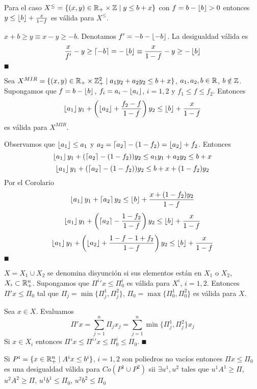 \documentclass[MIOP.tex]{subfiles}
\begin{document}
\begin{coro}
Para el caso $X^\leq =\{(x,y)\in\mathbb{R}_+\times \mathbb{Z} \mid y\leq b+x\}$ con $f=b-\left\lfloor{b}\right\rfloor>0$ entonces $y\leq \left\lfloor{b}\right\rfloor+\frac{x}{1-f}$ es válida para $X^\leq$.
\end{coro}
\begin{dem}
$x+b\geq y \equiv x-y\geq -b$. Denotamos $f'=-b-\left\lfloor{-b}\right\rfloor$. La desigualdad válida es 
$$
\frac{x}{f'}-y\geq \left\lceil{-b}\right\rceil=-\left\lfloor{b}\right\rfloor \equiv \frac{x}{1-f}-y \geq -\left\lfloor{b}\right\rfloor
$$
$\QED$
\end{dem}
\begin{propi}
Sea $X^{MIR}=\{(x,y)\in\mathbb{R}_+\times \mathbb{Z}_+^2 \mid a_1y_2+a_2y_2\leq b+x\}$, $a_1,a_2,b\in\mathbb{R}$, $b\notin \mathbb{Z}$. Supongamos que $f=b-\left\lfloor{b}\right\rfloor$, $f_i = a_i -\left\lfloor{a_i}\right\rfloor$, $i=1,2$ y $f_1\leq f\leq f_2$. Entonces 
$$
\left\lfloor{a_1}\right\rfloor y_1+\left(\left\lfloor{a_2}\right\rfloor+\frac{f_2-f}{1-f}\right)y_2\leq \left\lfloor{b}\right\rfloor+\frac{x}{1-f}$$
es válida para $X^{MIR}$.
\end{propi}
\begin{dem}
Observamos que $\left\lfloor{a_1}\right\rfloor\leq a_1$ y $a_2=\left\lceil{a_2}\right\rceil-(1-f_2)=\left\lfloor{a_2}\right\rfloor+f_2$. Entonces
$$
\left\lfloor{a_1}\right\rfloor y_1+(\left\lceil{a_2}\right\rceil-(1-f_2))y_2 \leq a_1y_1 + a_2y_2\leq b+x
$$
$$\left\lfloor{a_1}\right\rfloor y_1+(\left\lceil{a_2}\right\rceil-(1-f_2))y_2 \leq b+x+(1-f_2)y_2$$
Por el Corolario
$$
\left\lfloor{a_1}\right\rfloor y_1+\left\lceil{a_2}\right\rceil y_2 \leq \left\lfloor{b}\right\rfloor+\frac{x+(1-f_2)y_2}{1-f}
$$
$$
\left\lfloor{a_1}\right\rfloor y_1+\left(\left\lceil{a_2}\right\rceil-\frac{1-f_2}{1-f}\right)y_2 \leq \left\lfloor{b}\right\rfloor+\frac{x}{1-f}
$$
$$
\left\lfloor{a_1}\right\rfloor y_1+\left(\left\lfloor{a_2}\right\rfloor+\frac{1-f-1+f_2}{1-f}\right)y_2\leq \left\lfloor{b}\right\rfloor+\frac{x}{1-f}
$$
$\QED$
\end{dem}
\begin{prop}
$X=X_1\cup X_2$ se denomina disyunción si sus elementos están en $X_1$ o $X_2$, $X_i\subset \mathbb{R}^n_+$. Supongamos que ${\Pi^i}'x\leq \Pi^i_0$ es válida para $X^i$, $i=1,2$. Entonces $\Pi' x\leq \Pi_0$ tal que $\Pi_j=\min\{\Pi^1_j,\Pi^2_j\}$, $\Pi_0 =\max\{\Pi^1_0,\Pi^2_0\}$ es válida para $X$.
\end{prop}
\begin{dem}
Sea $x\in X$. Evaluamos
$$
\Pi' x = \sum_{j=1}^n \Pi_j x_j = \sum_{j=1}^n \min\{\Pi_j^1,\Pi_j^2\}x_j
$$
Si $x\in X_i$ entonces $\Pi'x \leq {\Pi^i}' x \leq \Pi_0^i \leq \Pi_0$. 
$\QED$
\end{dem}
\begin{prop}
Si $P^i = \{x\in\mathbb{R}^n_+\mid A^i x \leq b^i\}$, $i=1,2$ son poliedros no vacíos entonces $\Pi x\leq \Pi_0$ es una desigualdad válida para $Co(P^1\cup P^2)$ sii $\exists u^1,u^2$ tales que $u^1A^1\geq \Pi$, $u^2A^2 \geq \Pi$, $u^1 b^1 \leq \Pi_0$, $u^2b^2\leq \Pi_0$
\end{prop}
\end{document}
